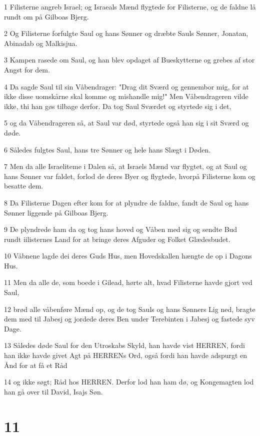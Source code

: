 \par 1 Filisterne angreb Israel; og Israeals Mænd flygtede for Filisterne, og de faldne lå rundt om på Gilboas Bjerg.
\par 2 Og Filisterne forfulgte Saul og hans Sønner og dræbte Sauls Sønner, Jonatan, Abinadab og Malkisjua.
\par 3 Kampen rasede om Saul, og han blev opdaget af Bueskytterne og grebes af stor Angst for dem.
\par 4 Da sagde Saul til sin Våbendrager: "Drag dit Sværd og gennembor mig, for at ikke disse uomskårne skal komme og mishandle mig!" Men Våbendrageren vilde ikke, thi han gøs tilbage derfor. Da tog Saul Sværdet og styrtede sig i det,
\par 5 og da Våbendrageren så, at Saul var død, styrtede også han sig i sit Sværd og døde.
\par 6 Således fulgtes Saul, hans tre Sønner og hele hans Slægt i Døden.
\par 7 Men da alle Israeliteme i Dalen så, at Israels Mænd var flygtet, og at Saul og hans Sønner var faldet, forlod de deres Byer og flygtede, hvorpå Filisterne kom og besatte dem.
\par 8 Da Filisterne Dagen efter kom for at plyndre de faldne, fandt de Saul og hans Sønner liggende på Gilboas Bjerg.
\par 9 De plyndrede ham da og tog hans hoved og Våben med sig og sendte Bud rundt iilisternes Land for at bringe deres Afguder og Folket Glædesbudet.
\par 10 Våbnene lagde dei deres Guds Hus, men Hovedskallen hængte de op i Dagons Hus.
\par 11 Men da alle de, som boede i Gilead, hørte alt, hvad Filisterne havde gjort ved Saul,
\par 12 brød alle våbenføre Mænd op, og de tog Sauls og hans Sønners Lig ned, bragte dem med til Jabesj og jordede deres Ben under Terebinten i Jabesj og fastede syv Dage.
\par 13 Således døde Saul for den Utroskabs Skyld, han havde vist HERREN, fordi han ikke havde givet Agt på HERRENs Ord, også fordi han havde adspurgt en Ånd for at få et Råd
\par 14 og ikke søgt; Råd hos HERREN. Derfor lod han ham dø, og Kongemagten lod han gå over til David, Isajs Søn.

\chapter{11}

